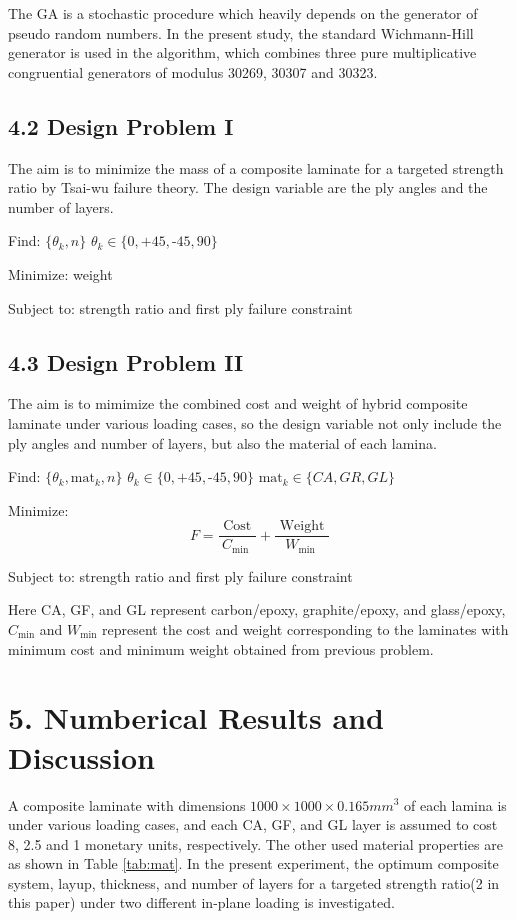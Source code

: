 \documentclass[Afour,sagev,times]{sagej}
\begin{document}
The GA is a stochastic procedure which heavily depends on the generator of pseudo random numbers. In
the present study, the standard Wichmann-Hill generator is used in the algorithm, which combines
three pure multiplicative congruential generators of modulus 30269, 30307 and 30323. 


\subsection{4.2 Design Problem I}

The aim is to minimize the mass of a composite laminate for a targeted strength
ratio by Tsai-wu failure theory. The design variable are the ply angles and the
number of layers.

Find: $\{\theta_k, n\}$ $\theta_k \in \{ 0,\text{+}45,\text{-}45,90\}$ 

Minimize: weight

Subject to: strength ratio and first ply failure constraint


\subsection{4.3 Design Problem II}
The aim is to mimimize the combined cost and weight of hybrid composite
laminate under various loading cases, so the design variable not only include
the ply angles and number of layers, but also the material of each lamina. 


Find: $\{\theta_k,\text{mat}_k, n\}$ $\theta_k \in \{ 0,\text{+}45,\text{-}45,90\}$ $\text{mat}_k \in \{CA, GR, GL \}$

Minimize: 
\begin{equation}
	F=\frac{\text { Cost }}{C_{\text {min }}}+\frac{\text { Weight }}{W_{\text {min }}}
\end{equation}

Subject to: strength ratio and first ply failure constraint


Here CA, GF, and GL represent carbon/epoxy, graphite/epoxy, and glass/epoxy,
 $C_{\text{min}}$ and $W_{\text{min}}$ represent the cost and
weight corresponding to the laminates with minimum cost and minimum weight
obtained from previous problem.

\section{5. Numberical Results and Discussion}
A composite laminate with dimensions $1000 \times 1000 \times 0.165 mm^3$ of
each lamina is under various loading cases, and each CA, GF, and GL layer is
assumed to cost 8, 2.5 and 1 monetary units, respectively.  The other used
material properties are as shown in Table \ref{tab:mat}.  In the present
experiment,  the optimum composite system, layup, thickness, and number of
layers for a targeted strength ratio(2 in this paper) under two different
in-plane loading is investigated.
\end{document}
